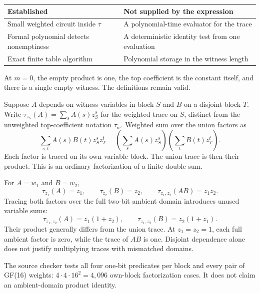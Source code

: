 \begin{center}
\begin{tabularx}{\textwidth}{@{}p{1.8in}X@{}}\toprule
Established & Not supplied by the expression\\\midrule
Small weighted circuit inside $\tau$ & A polynomial-time evaluator for the trace\\
Formal polynomial detects nonemptiness & A deterministic identity test from one evaluation\\
Exact finite table algorithm & Polynomial storage in the witness length\\\bottomrule
\end{tabularx}
\end{center}

At $m=0$, the empty product is one, the top coefficient is the constant
itself, and there is a single empty witness. The definitions remain valid.


Suppose $A$ depends on witness variables in block $S$ and $B$ on a disjoint
block $T$. Write $\tau_{z_S}(A)=\sum_s A(s)z_S^s$ for the weighted trace
on $S$, distinct from the unweighted top-coefficient notation $\tau_w$.
Weighted sum over the union factors as
\[
 \sum_{s,t} A(s)B(t)z_S^s z_T^t
 =\left(\sum_s A(s)z_S^s\right)
  \left(\sum_t B(t)z_T^t\right).
\]
Each factor is traced on its own variable block. The union trace is then
their product. This is an ordinary factorization of a finite double sum.

For $A=w_1$ and $B=w_2$,
\[
 \tau_{z_1}(A)=z_1,\qquad \tau_{z_2}(B)=z_2,\qquad
 \tau_{z_1,z_2}(AB)=z_1z_2.
\]
Tracing both factors over the full two-bit ambient domain introduces unused
variable sums:
\[
 \tau_{z_1,z_2}(A)=z_1(1+z_2),\qquad
 \tau_{z_1,z_2}(B)=z_2(1+z_1).
\]
Their product generally differs from the union trace. At $z_1=z_2=1$, each
full ambient factor is zero, while the trace of $AB$ is one. Disjoint
dependence alone does not justify multiplying traces with mismatched domains.

The source checker tests all four one-bit predicates per block and every
pair of GF(16) weights: $4\cdot4\cdot16^2=4,096$ own-block factorization
cases. It does not claim an ambient-domain product identity.


